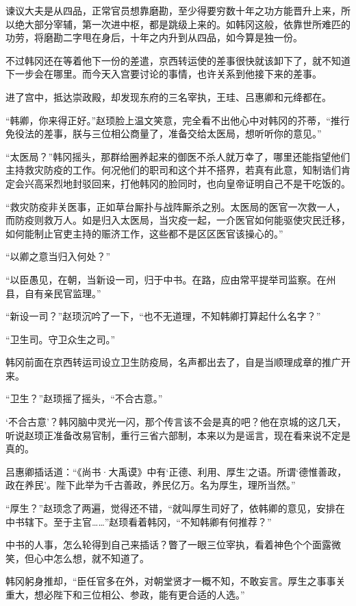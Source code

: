 谏议大夫是从四品，正常官员想靠磨勘，至少得要穷数十年之功方能晋升上来，所以绝大部分宰辅，第一次进中枢，都是跳级上来的。如韩冈这般，依靠世所难匹的功劳，将磨勘二字甩在身后，十年之内升到从四品，如今算是独一份。

不过韩冈还在等着他下一份的差遣，京西转运使的差事很快就该卸下了，就不知道下一步会在哪里。而今天入宫要讨论的事情，也许关系到他接下来的差事。

进了宫中，抵达崇政殿，却发现东府的三名宰执，王珪、吕惠卿和元绛都在。

“韩卿，你来得正好。”赵顼脸上温文笑意，完全看不出他心中对韩冈的芥蒂，“推行免役法的差事，朕与三位相公商量了，准备交给太医局，想听听你的意见。”

“太医局？”韩冈摇头，那群给圈养起来的御医不杀人就万幸了，哪里还能指望他们主持救灾防疫的工作。何况他们的职司和这个并不搭界，若真有此意，知制诰们肯定会兴高采烈地封驳回来，打他韩冈的脸同时，也向皇帝证明自己不是干吃饭的。

“救灾防疫非关医事，正如草台厮扑与战阵厮杀之别。太医局的医官一次救一人，而防疫则救万人。如是归入太医局，当灾疫一起，一介医官如何能驱使灾民迁移，如何能制止官吏主持的赈济工作，这些都不是区区医官该操心的。”

“以卿之意当归入何处？”

“以臣愚见，在朝，当新设一司，归于中书。在路，应由常平提举司监察。在州县，自有亲民官监理。”

“新设一司？”赵顼沉吟了一下，“也不无道理，不知韩卿打算起什么名字？”

“卫生司。守卫众生之司。”

韩冈前面在京西转运司设立卫生防疫局，名声都出去了，自是当顺理成章的推广开来。

“卫生？”赵顼摇了摇头，“不合古意。”

‘不合古意’？韩冈脑中灵光一闪，那个传言该不会是真的吧？他在京城的这几天，听说赵顼正准备改易官制，重行三省六部制，本来以为是谣言，现在看来说不定是真的。

吕惠卿插话道：“《尚书·大禹谟》中有‘正德、利用、厚生’之语。所谓‘德惟善政，政在养民’。陛下此举为千古善政，养民亿万。名为厚生，理所当然。”

“厚生？”赵顼念了两遍，觉得还不错，“就叫厚生司好了，依韩卿的意见，安排在中书辖下。至于主官……”赵顼看着韩冈，“不知韩卿有何推荐？”

中书的人事，怎么轮得到自己来插话？瞥了一眼三位宰执，看着神色个个面露微笑，但心中怎么想，就不知道了。

韩冈躬身推却，“臣任官多在外，对朝堂贤才一概不知，不敢妄言。厚生之事事关重大，想必陛下和三位相公、参政，能有更合适的人选。”

